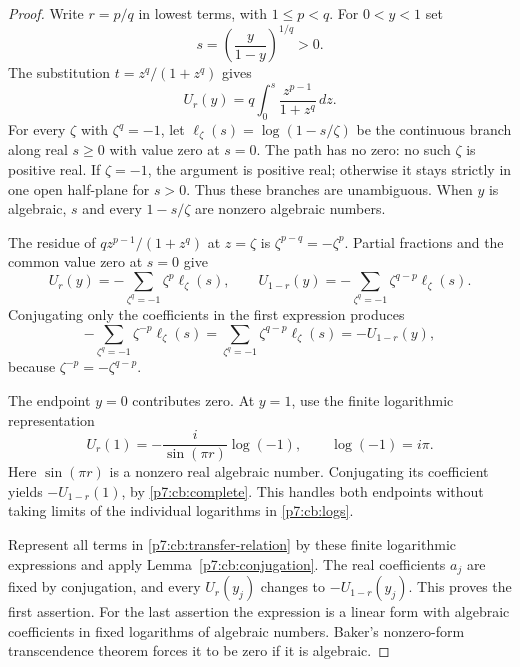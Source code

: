 \documentclass[11pt,a4paper]{article}
\theoremstyle{definition}
\theoremstyle{remark}
\numberwithin{equation}{section}
\begin{document}
\begin{proof}
Write $r=p/q$ in lowest terms, with $1\le p<q$.
For $0<y<1$ set
\[
 s=\left(\frac{y}{1-y}\right)^{1/q}>0.
\]
The substitution $t=z^q/(1+z^q)$ gives
\begin{equation}\label{p7:cb:rational-integral}
 U_r(y)=q\int_0^s\frac{z^{p-1}}{1+z^q}\,dz.
\end{equation}
For every $\zeta$ with $\zeta^q=-1$, let
$\ell_\zeta(s)=\log(1-s/\zeta)$ be the continuous branch
along real $s\ge0$ with value zero at $s=0$.
The path has no zero: no such $\zeta$ is positive real.
If $\zeta=-1$, the argument is positive real; otherwise it
stays strictly in one open half-plane for $s>0$. Thus these
branches are unambiguous. When $y$ is algebraic, $s$ and every
$1-s/\zeta$ are nonzero algebraic numbers.

The residue of $qz^{p-1}/(1+z^q)$ at $z=\zeta$ is
$\zeta^{p-q}=-\zeta^p$. Partial fractions and the common
value zero at $s=0$ give
\begin{equation}\label{p7:cb:logs}
 U_r(y)=-\sum_{\zeta^q=-1}\zeta^p\ell_\zeta(s),
 \qquad
 U_{1-r}(y)=-\sum_{\zeta^q=-1}\zeta^{q-p}\ell_\zeta(s).
\end{equation}
Conjugating only the coefficients in the first expression
produces
\[
 -\sum_{\zeta^q=-1}\zeta^{-p}\ell_\zeta(s)
 =\sum_{\zeta^q=-1}\zeta^{q-p}\ell_\zeta(s)
 =-U_{1-r}(y),
\]
because $\zeta^{-p}=-\zeta^{q-p}$.

The endpoint $y=0$ contributes zero. At $y=1$, use the
finite logarithmic representation
\begin{equation}\label{p7:cb:endpoint}
 U_r(1)=-\frac{i}{\sin(\pi r)}\log(-1),
 \qquad\log(-1)=i\pi.
\end{equation}
Here $\sin(\pi r)$ is a nonzero real algebraic number.
Conjugating its coefficient yields $-U_{1-r}(1)$, by
\eqref{p7:cb:complete}. This handles both endpoints without
taking limits of the individual logarithms in \eqref{p7:cb:logs}.

Represent all terms in \eqref{p7:cb:transfer-relation} by these
finite logarithmic expressions and apply
Lemma~\ref{p7:cb:conjugation}. The real coefficients $a_j$ are
fixed by conjugation, and every $U_r(y_j)$ changes to
$-U_{1-r}(y_j)$. This proves the first assertion.
For the last assertion the expression is a linear form with
algebraic coefficients in fixed logarithms of algebraic numbers.
Baker's nonzero-form transcendence theorem forces it to be zero
if it is algebraic.
\end{proof}
\end{document}
